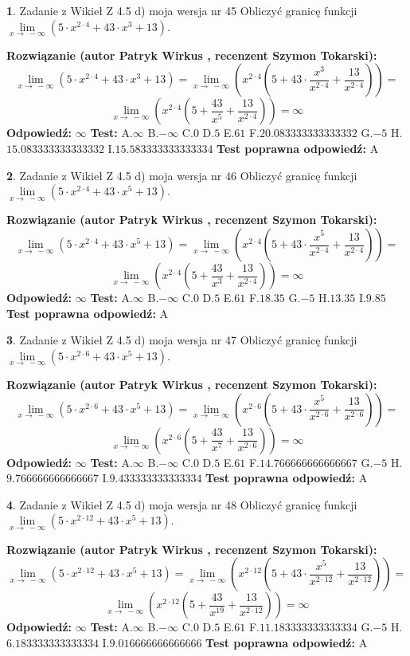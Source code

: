 \documentclass[12pt, a4paper]{article}
\theoremstyle{definition} %
\newtheorem{zad}{}
\newcommand{\zadStart}[1]{\begin{zad}#1\newline}
\newcommand{\zadStop}{\end{zad}}
\newcommand{\rozwStart}[2]{\noindent \textbf{Rozwiązanie (autor #1 , recenzent #2): }\newline}
\newcommand{\rozwStop}{\newline}
\newcommand{\odpStart}{\noindent \textbf{Odpowiedź:}\newline}
\newcommand{\odpStop}{\newline}
\newcommand{\testStart}{\noindent \textbf{Test:}\newline}
\newcommand{\testStop}{\newline}
\newcommand{\kluczStart}{\noindent \textbf{Test poprawna odpowiedź:}\newline}
\newcommand{\kluczStop}{\newline}
\begin{document}
\zadStart{Zadanie z Wikieł Z 4.5 d) moja wersja nr 45}
Obliczyć granicę funkcji  $\lim\limits_{x\to\ -\infty}(5 \cdot x^{2\cdot4}+43 \cdot x^{3}+13)$.
\zadStop
\rozwStart{Patryk Wirkus}{Szymon Tokarski}
$$\lim\limits_{x\to\ -\infty}(5 \cdot x^{2\cdot4}+43 \cdot x^{3}+13) = \lim\limits_{x\to\ -\infty}(x^{2\cdot4}(5 +43 \cdot \frac{x^{3}}{x^{2\cdot4}}+\frac{13}{x^{2\cdot4}})) =$$ $$\lim\limits_{x\to\ -\infty}(x^{2\cdot4}(5 +\frac{43}{x^{5}}+\frac{13}{x^{2\cdot4}})) =\infty$$
\rozwStop
\odpStart
$\infty$
\odpStop
\testStart
A.$\infty$ B.$-\infty$ C.$0$ D.$5$ E.$61$
F.$20.083333333333332$ G.$-5$
H.$15.083333333333332$
I.$15.583333333333334$
\testStop
\kluczStart
A
\kluczStop



\zadStart{Zadanie z Wikieł Z 4.5 d) moja wersja nr 46}
Obliczyć granicę funkcji  $\lim\limits_{x\to\ -\infty}(5 \cdot x^{2\cdot4}+43 \cdot x^{5}+13)$.
\zadStop
\rozwStart{Patryk Wirkus}{Szymon Tokarski}
$$\lim\limits_{x\to\ -\infty}(5 \cdot x^{2\cdot4}+43 \cdot x^{5}+13) = \lim\limits_{x\to\ -\infty}(x^{2\cdot4}(5 +43 \cdot \frac{x^{5}}{x^{2\cdot4}}+\frac{13}{x^{2\cdot4}})) =$$ $$\lim\limits_{x\to\ -\infty}(x^{2\cdot4}(5 +\frac{43}{x^{3}}+\frac{13}{x^{2\cdot4}})) =\infty$$
\rozwStop
\odpStart
$\infty$
\odpStop
\testStart
A.$\infty$ B.$-\infty$ C.$0$ D.$5$ E.$61$
F.$18.35$ G.$-5$
H.$13.35$
I.$9.85$
\testStop
\kluczStart
A
\kluczStop



\zadStart{Zadanie z Wikieł Z 4.5 d) moja wersja nr 47}
Obliczyć granicę funkcji  $\lim\limits_{x\to\ -\infty}(5 \cdot x^{2\cdot6}+43 \cdot x^{5}+13)$.
\zadStop
\rozwStart{Patryk Wirkus}{Szymon Tokarski}
$$\lim\limits_{x\to\ -\infty}(5 \cdot x^{2\cdot6}+43 \cdot x^{5}+13) = \lim\limits_{x\to\ -\infty}(x^{2\cdot6}(5 +43 \cdot \frac{x^{5}}{x^{2\cdot6}}+\frac{13}{x^{2\cdot6}})) =$$ $$\lim\limits_{x\to\ -\infty}(x^{2\cdot6}(5 +\frac{43}{x^{7}}+\frac{13}{x^{2\cdot6}})) =\infty$$
\rozwStop
\odpStart
$\infty$
\odpStop
\testStart
A.$\infty$ B.$-\infty$ C.$0$ D.$5$ E.$61$
F.$14.766666666666667$ G.$-5$
H.$9.766666666666667$
I.$9.433333333333334$
\testStop
\kluczStart
A
\kluczStop



\zadStart{Zadanie z Wikieł Z 4.5 d) moja wersja nr 48}
Obliczyć granicę funkcji  $\lim\limits_{x\to\ -\infty}(5 \cdot x^{2\cdot12}+43 \cdot x^{5}+13)$.
\zadStop
\rozwStart{Patryk Wirkus}{Szymon Tokarski}
$$\lim\limits_{x\to\ -\infty}(5 \cdot x^{2\cdot12}+43 \cdot x^{5}+13) = \lim\limits_{x\to\ -\infty}(x^{2\cdot12}(5 +43 \cdot \frac{x^{5}}{x^{2\cdot12}}+\frac{13}{x^{2\cdot12}})) =$$ $$\lim\limits_{x\to\ -\infty}(x^{2\cdot12}(5 +\frac{43}{x^{19}}+\frac{13}{x^{2\cdot12}})) =\infty$$
\rozwStop
\odpStart
$\infty$
\odpStop
\testStart
A.$\infty$ B.$-\infty$ C.$0$ D.$5$ E.$61$
F.$11.183333333333334$ G.$-5$
H.$6.183333333333334$
I.$9.016666666666666$
\testStop
\kluczStart
A
\kluczStop
\end{document}
